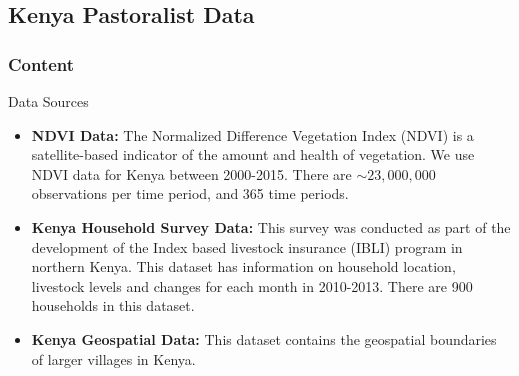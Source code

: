 \documentclass{beamer}
\begin{document}
    



\subsection{Kenya Pastoralist Data}
\begin{frame}
    \frametitle{Content}
\end{frame}

\begin{frame}{Data Sources}
\begin{itemize}
    \setlength\itemsep{1em}
    \item \textbf{NDVI Data:} The Normalized Difference Vegetation Index (NDVI) is a satellite-based indicator of the amount and health of vegetation. We use NDVI data for Kenya between 2000-2015. There are $\sim 23,000,000$ observations per time period, and 365 time periods.
    \item \textbf{Kenya Household Survey Data:} This survey was conducted as part of the development of the Index based livestock insurance (IBLI) program in northern Kenya.  This dataset has information on household location, livestock levels and changes for each month in 2010-2013. There are 900 households in this dataset. 
    \item \textbf{Kenya Geospatial Data:} This dataset contains the geospatial boundaries of larger villages in Kenya. 
\end{itemize}
\end{frame}
\end{document}

